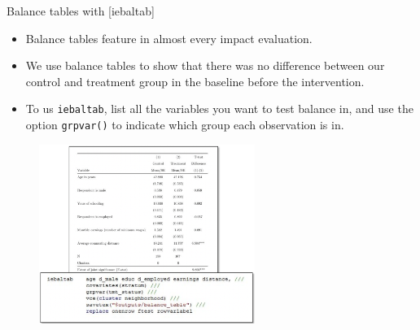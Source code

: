\documentclass[aspectratio=169]{beamer}
\begin{document}
\begin{frame}{Balance tables with [iebaltab]}
	\begin{multicols}{2}	
		
		\begin{itemize}[<default overlay specification>]
			\item<1> Balance tables feature in almost every impact evaluation.
			\item<1> We use balance tables to show that there was no difference between our control and treatment group in the baseline before the intervention. 
			\item<1> To us \texttt{iebaltab}, list all the variables you want to test balance in, and use the option \texttt{grpvar()} to indicate which group each observation is in.
		\end{itemize}
		
		\begin{figure}
			\centering
			\includegraphics[width=70mm]{img/Iebaltab}
		\end{figure}
		
	\end{multicols}
\end{frame}
\end{document}
